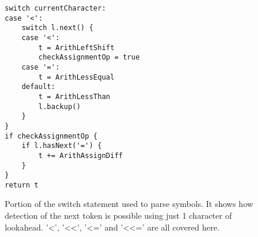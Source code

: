 \begin{figure}[h]
\begin{lstlisting}[frame=tb]
switch currentCharacter:
case '<':
	switch l.next() {
	case '<':
		t = ArithLeftShift
		checkAssignmentOp = true
	case '=':
		t = ArithLessEqual
	default:
		t = ArithLessThan
		l.backup()
	}
}
if checkAssignmentOp {
	if l.hasNext('=') {
		t += ArithAssignDiff
	}
}
return t
\end{lstlisting}
\caption[Sample of Arithmetic Symbol Lexing]{Portion of the switch statement used to parse symbols. It shows how detection of the next token is possible using just 1 character of lookahead. '<', '<<', '<=' and '<<=' are all covered here.\label{lst:arith-symbol-lex}}
\end{figure}


